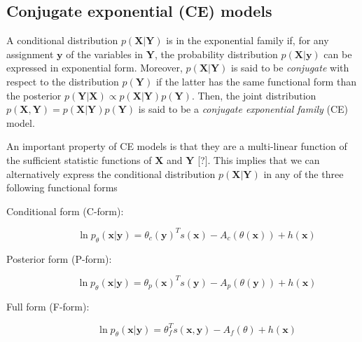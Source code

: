 \documentclass[11pt, oneside]{article}   	%
\newcommand{\bm}{\mathbf}
\numberwithin{figure}{section}
\numberwithin{equation}{section}
\numberwithin{table}{section}
\theoremstyle{definition}
\begin{document}


\subsection{Conjugate exponential (CE) models} \label{sec:CondDist}

A conditional distribution $p(\bm X | \bm Y)$ is  in the exponential family if, for any assignment $\bm y$ of the variables in $\bm Y$, the probability distribution $p(\bm X|\bm y)$ can be expressed in exponential form. Moreover,  $p(\bm X | \bm Y)$ is said to be \textit{conjugate} with respect to the distribution $p(\bm Y)$ if the latter has the same functional form than the posterior $p(\bm Y|\bm X)\propto p(\bm X|\bm Y)p(\bm Y)$. Then, the joint distribution $p(\bm X, \bm Y)= p(\bm X|\bm Y)p(\bm Y)$ is said to be a \textit{conjugate exponential family} (CE) model. 

An important property of CE models is that they are a multi-linear function of the sufficient statistic functions of $\bm X$ and $\bm Y$ [?]. This implies that we can alternatively express the conditional distribution $p(\bm X|\bm Y)$ in any of the three following functional forms 

\begin{description}

\item[Conditional form (C-form):]
\begin{equation}
\label{Equation:EqCED}
\ln p_\theta(\bm x | \bm y) = \theta_c(\bm y)^Ts(\bm x) - A_c(\theta(\bm x)) + h(\bm x) 
\end{equation}

\item[Posterior form (P-form):]
\begin{equation}
\label{Equation:EqCED}
\ln p_\theta(\bm x | \bm y) = \theta_p(\bm x)^Ts(\bm y) - A_p(\theta(\bm y)) + h(\bm x) 
\end{equation}

\item[Full form (F-form):]
\begin{equation}
\label{Equation:EqCED}
\ln p_\theta(\bm x | \bm y) = \theta_f^Ts(\bm x,\bm y) - A_f(\theta) + h(\bm x) 
\end{equation}

\end{description}
\end{document}
